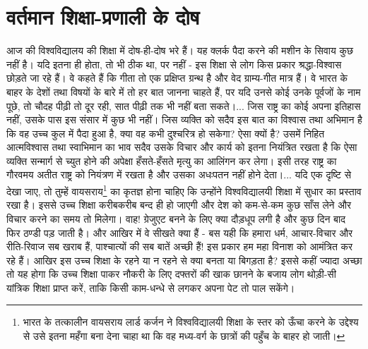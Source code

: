 \section*{वर्तमान शिक्षा-प्रणाली के दोष}


आज की विश्वविद्यालय की शिक्षा में दोष-ही-दोष भरे हैं। यह क्लर्क पैदा करने की मशीन के सिवाय कुछ नहीं है। यदि इतना ही होता, तो भी ठीक था, पर नहीं - इस शिक्षा से लोग किस प्रकार श्रद्धा-विश्वास छोड़ते जा रहे हैं। वे कहते हैं कि गीता तो एक प्रक्षिप्त ग्रन्थ है और वेद ग्राम्य-गीत मात्र हैं। वे भारत के बाहर के देशों तथा विषयों के बारे में तो हर बात जानना चाहते हैं, पर यदि उनसे कोई उनके पूर्वजों के नाम पूछे, तो चौदह पीढ़ी तो दूर रही, सात पीढ़ी तक भी नहीं बता सकते।... जिस राष्ट्र का कोई अपना इतिहास नहीं, उसके पास इस संसार में कुछ भी नहीं। जिस व्यक्ति को सदैव इस बात का विश्वास तथा अभिमान है कि वह उच्च कुल में पैदा हुआ है, क्या वह कभी दुश्चरित्र हो सकेगा? ऐसा क्यों है? उसमें निहित आत्मविश्वास तथा स्वाभिमान का भाव सदैव उसके विचार और कार्य को इतना नियंत्रित रखता है कि ऐसा व्यक्ति सन्मार्ग से च्युत होने की अपेक्षा हँसते-हँसते मृत्यु का आलिंगन कर लेगा। इसी तरह राष्ट्र का गौरवमय अतीत राष्ट्र को नियंत्रण में रखता है और उसका अधःपतन नहीं होने देता।... यदि एक दृष्टि से देखा जाए, तो तुम्हें वायसराय\footnote{ भारत के तत्कालीन वायसराय लार्ड कर्जन ने विश्वविद्यालयी शिक्षा के स्तर को ऊँचा करने के उद्देश्य से उसे इतना महँगा बना देना चाहा था कि वह मध्य-वर्ग के छात्रों की पहुँच के बाहर हो जाती।} का कृतज्ञ होना चाहिए कि उन्होंने विश्वविद्यालयी शिक्षा में सुधार का प्रस्ताव रखा है। इससे उच्च शिक्षा करीबकरीब बन्द ही हो जाएगी और देश को कम-से-कम कुछ साँस लेने और विचार करने का समय तो मिलेगा। वाह! ग्रेजुएट बनने के लिए क्या दौड़धूप लगी है और कुछ दिन बाद फिर ठण्डी पड़ जाती है। और आखिर में वे सीखते क्या हैं - बस यही कि हमारा धर्म, आचार-विचार और रीति-रिवाज सब खराब हैं, पाश्चात्यों की सब बातें अच्छी हैं! इस प्रकार हम महा विनाश को आमंत्रित कर रहे हैं। आखिर इस उच्च शिक्षा के रहने या न रहने से क्या बनता या बिगड़ता है? इससे कहीं ज्यादा अच्छा तो यह होगा कि उच्च शिक्षा पाकर नौकरी के लिए दफ्तरों की खाक छानने के बजाय लोग थोड़ी-सी यांत्रिक शिक्षा प्राप्त करें, ताकि किसी काम-धन्धे से लगकर अपना पेट तो पाल सकेंगे। 

\vskip 3pt

